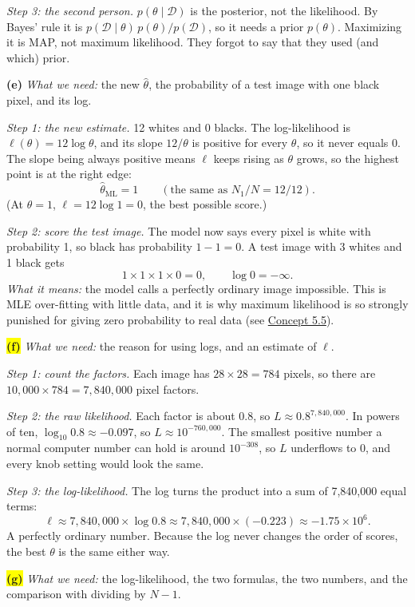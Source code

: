 \documentclass[12pt,a4paper]{article}
\begin{document}
\emph{Step 3: the second person.} $p(\theta\mid\mathcal{D})$ is the posterior, not the likelihood. By Bayes' rule it is $p(\mathcal{D}\mid\theta)\,p(\theta)/p(\mathcal{D})$, so it needs a prior $p(\theta)$. Maximizing it is MAP, not maximum likelihood. They forgot to say that they used (and which) prior.

\textbf{(e)} \emph{What we need:} the new $\hat\theta$, the probability of a test image with one black pixel, and its log.

\emph{Step 1: the new estimate.} 12 whites and 0 blacks. The log-likelihood is $\ell(\theta)=12\log\theta$, and its slope $12/\theta$ is positive for every $\theta$, so it never equals 0. The slope being always positive means $\ell$ keeps rising as $\theta$ grows, so the highest point is at the right edge:
\[
\hat\theta_{\text{ML}}=1\qquad(\text{the same as }N_1/N=12/12).
\]
(At $\theta=1$, $\ell=12\log1=0$, the best possible score.)

\emph{Step 2: score the test image.} The model now says every pixel is white with probability 1, so black has probability $1-1=0$. A test image with 3 whites and 1 black gets
\[
1\times1\times1\times0=0,\qquad\log0=-\infty .
\]
\emph{What it means:} the model calls a perfectly ordinary image impossible. This is MLE over-fitting with little data, and it is why maximum likelihood is so strongly punished for giving zero probability to real data (see \hyperref[c5-5]{Concept 5.5}).

\colorbox{yellow}{\textbf{(f)}} \emph{What we need:} the reason for using logs, and an estimate of $\ell$.

\emph{Step 1: count the factors.} Each image has $28\times28=784$ pixels, so there are $10{,}000\times784=7{,}840{,}000$ pixel factors.

\emph{Step 2: the raw likelihood.} Each factor is about 0.8, so $L\approx0.8^{7{,}840{,}000}$. In powers of ten, $\log_{10}0.8\approx-0.097$, so $L\approx10^{-760{,}000}$. The smallest positive number a normal computer number can hold is around $10^{-308}$, so $L$ underflows to 0, and every knob setting would look the same.

\emph{Step 3: the log-likelihood.} The log turns the product into a sum of 7,840,000 equal terms:
\[
\ell\approx7{,}840{,}000\times\log0.8\approx7{,}840{,}000\times(-0.223)\approx-1.75\times10^{6}.
\]
A perfectly ordinary number. Because the log never changes the order of scores, the best $\theta$ is the same either way.

\colorbox{yellow}{\textbf{(g)}} \emph{What we need:} the log-likelihood, the two formulas, the two numbers, and the comparison with dividing by $N-1$.
\end{document}
